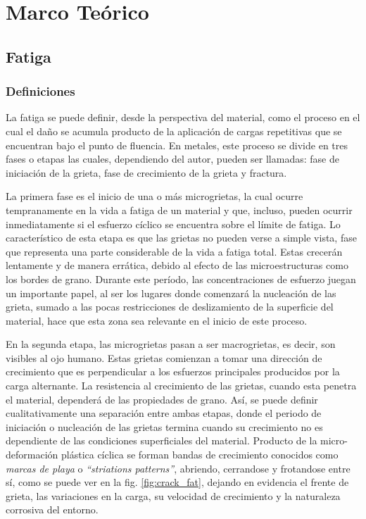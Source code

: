 \chapter{Marco Teórico}
\section{Fatiga}

\subsection{Definiciones}
La fatiga se puede definir, desde la perspectiva del material, como el proceso en el cual el daño se acumula producto de la aplicación de cargas repetitivas que se encuentran bajo el punto de fluencia. En metales, este proceso se divide en tres fases o etapas las cuales, dependiendo del autor, pueden ser llamadas: fase de iniciación de la grieta, fase de crecimiento de la grieta y fractura.

La primera fase es el inicio de una o más microgrietas, la cual ocurre tempranamente en la vida a fatiga de un material y que, incluso, pueden ocurrir inmediatamente si el esfuerzo cíclico se encuentra sobre el límite de fatiga. Lo característico de esta etapa es que las grietas no pueden verse a simple vista, fase que representa una parte considerable de la vida a fatiga total. Estas crecerán lentamente y de manera errática, debido al efecto de las microestructuras como los bordes de grano. Durante este período, las concentraciones de esfuerzo juegan un importante papel, al ser los lugares donde comenzará la nucleación de las grieta, sumado a las pocas restricciones de deslizamiento de la superficie del material, hace que esta zona sea relevante en el inicio de este proceso.

En la segunda etapa, las microgrietas pasan a ser macrogrietas, es decir, son visibles al ojo humano. Estas grietas comienzan a tomar una dirección de crecimiento que es perpendicular a los esfuerzos principales producidos por la carga alternante. La resistencia al crecimiento de las grietas, cuando esta penetra el material, dependerá de las propiedades de grano. Así, se puede definir cualitativamente una separación entre ambas etapas, donde el periodo de iniciación o nucleación de las grietas termina cuando su crecimiento no es dependiente de las condiciones superficiales del material. Producto de la micro-deformación plástica cíclica se forman bandas de crecimiento conocidos como \textit{marcas de playa} o \textit{``striations patterns''}, abriendo, cerrandose y frotandose entre sí, como se puede ver en la fig. \ref{fig:crack_fat}, dejando en evidencia el frente de grieta, las variaciones en la carga, su velocidad de crecimiento y la naturaleza corrosiva del entorno.


